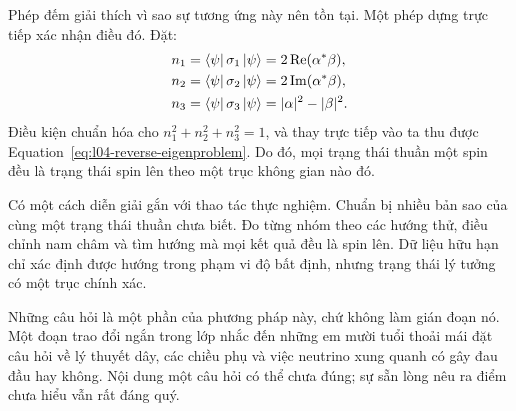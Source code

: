 \begin{classroomqa}
\end{classroomqa}

\begin{classroomqa}
\end{classroomqa}

Phép đếm giải thích vì sao sự tương ứng này nên tồn tại. Một phép dựng trực tiếp xác nhận điều đó. Đặt:
\begin{align}
  n_1&=\left\langle\psi\right\rvert\sigma_1\left\lvert\psi\right\rangle
      =2\operatorname{Re}(\alpha^*\beta),
  \notag\\
  n_2&=\left\langle\psi\right\rvert\sigma_2\left\lvert\psi\right\rangle
      =2\operatorname{Im}(\alpha^*\beta),
  \notag\\
  n_3&=\left\langle\psi\right\rvert\sigma_3\left\lvert\psi\right\rangle
      =|\alpha|^2-|\beta|^2.
  \label{eq:l04-bloch-components}
\end{align}
Điều kiện chuẩn hóa cho \(n_1^2+n_2^2+n_3^2=1\), và thay trực tiếp vào ta thu được Equation~\eqref{eq:l04-reverse-eigenproblem}. Do đó, mọi trạng thái thuần một spin đều là trạng thái spin lên theo một trục không gian nào đó.

Có một cách diễn giải gắn với thao tác thực nghiệm. Chuẩn bị nhiều bản sao của cùng một trạng thái thuần chưa biết. Đo từng nhóm theo các hướng thử, điều chỉnh nam châm và tìm hướng mà mọi kết quả đều là spin lên. Dữ liệu hữu hạn chỉ xác định được hướng trong phạm vi độ bất định, nhưng trạng thái lý tưởng có một trục chính xác.

Những câu hỏi là một phần của phương pháp này, chứ không làm gián đoạn nó. Một đoạn trao đổi ngắn trong lớp nhắc đến những em mười tuổi thoải mái đặt câu hỏi về lý thuyết dây, các chiều phụ và việc neutrino xung quanh có gây đau đầu hay không. Nội dung một câu hỏi có thể chưa đúng; sự sẵn lòng nêu ra điểm chưa hiểu vẫn rất đáng quý.

